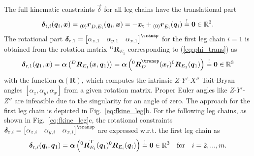 \documentclass[
	graybox,
	vecphys] %
	{svmult}
\newcommand{\bm}[1]{\boldsymbol{#1}}
\newcommand{\ortvek}[4]{{ }_{(#1)}{\boldsymbol{#2}}^{#3}_{#4} }
\newcommand{\rotmat}[2]{{{ }^{#1}\boldsymbol{R}}_{#2}}
\newcommand{\Res}[0]{\vec{\delta}}
\begin{document}
The full kinematic constraints $\Res$ for all leg chains have the translational part
%
\vspace{-0.1cm}
\begin{equation}
\Res_{\mathrm{t},i}(\vec{q}_i,\vec{x})
=
\ortvek{0}{r}{}{D,E_i}(\vec{q}_i,\vec{x})
=
- \vec{x}_{\mathrm{t}} + \ortvek{0}{r}{}{E_i}(\vec{q}_i) 
\overset{!}{=}
\vec{0}
\in {\mathbb{R}}^{3}
\label{eq:phi_trans}.
\vspace{-0.1cm}
\end{equation}
%
The rotational part 
$\Res_{\mathrm{r},1}
=
\begin{bmatrix}
\alpha_{z,1} & \alpha_{y,1} & \alpha_{x,1}
\end{bmatrix}^\transp$ 
for the first leg chain $i=1$ is obtained from the rotation matrix $\rotmat{D}{E_1}$ corresponding to (\ref{eq:phi_trans}) as
%
\vspace{-0.2cm}
\begin{equation}
\Res_{\mathrm{r},1}(\vec{q}_1,\vec{x})
=
\bm{\alpha}\left(\rotmat{D}{E_1}(\vec{x},\vec{q}_1)\right)
=
\bm{\alpha}\left(\rotmat{0}{D}^\transp (\vec{x}_{\mathrm{r}})\rotmat{0}{E_1}(\vec{q}_1)\right) 
\overset{!}{=}
\vec{0}
\in {\mathbb{R}}^{3}
\label{eq:phi1_rot}
\vspace{-0.1cm}
\end{equation}
%
with the function $\bm{\alpha}(\bm{R})$, which computes the intrinsic $Z$-$Y'$-$X''$ Tait-Bryan angles $[\alpha_z,\alpha_y,\alpha_x]$ from a given rotation matrix.
Proper Euler angles like $Z$-$Y'$-$Z''$ are infeasible due to the singularity for an angle of zero.
The approach for the first leg chain is depicted in Fig.~\ref{eq:fkine_leg}b.
%
For the following leg chains, as shown in Fig.~\ref{eq:fkine_leg}c, the rotational constraints
$\Res_{\mathrm{r},i}
=
\begin{bmatrix}
\alpha_{z,i} & \alpha_{y,i} & \alpha_{x,i}
\end{bmatrix}^\transp$ 
are expressed w.r.t. the first leg chain as
%
\begin{equation}
\vspace{-0.1cm}
\Res_{\mathrm{r},i}(\vec{q}_i,\vec{q}_1)
=
\bm{\alpha}\left(\rotmat{0}{E_1}^\mathrm{T}(\vec{q}_1)\rotmat{0}{E_i}(\vec{q}_i)\right)
\overset{!}{=}
\vec{0}
\in {\mathbb{R}}^{3}
\quad \mathrm{for} \quad i=2,...,m.
\label{eq:phi2_rot}
\vspace{-0.1cm}
\end{equation}
\end{document}
